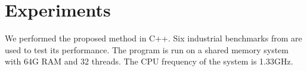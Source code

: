 \section{Experiments}
We performed the proposed method in C++. Six industrial benchmarks from \cite{IBM} are used to test its performance. The
program is run on a shared memory system with 64G RAM and 32 threads. The CPU frequency of the system is 1.33GHz. 




